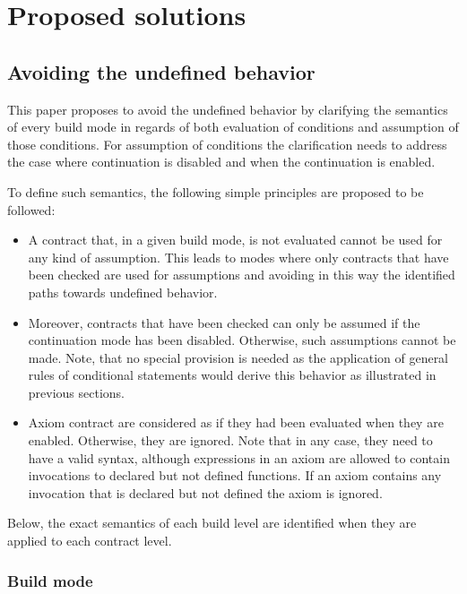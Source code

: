 \section{Proposed solutions}
\label{sec:proposed}

\subsection{Avoiding the undefined behavior}

This paper proposes to avoid the undefined behavior by clarifying the semantics of every
build mode in regards of both evaluation of conditions and assumption of those
conditions. For assumption of conditions the clarification needs to address the
case where continuation is disabled and when the continuation is enabled.

To define such semantics, the following simple principles are proposed to be followed:

\begin{itemize}

\item A contract that, in a given build mode, is not evaluated cannot be used
for any kind of assumption. This leads to modes where only contracts that have
been checked are used for assumptions and avoiding in this way the identified
paths towards undefined behavior.

\item Moreover, contracts that have been checked can only be assumed if the
continuation mode has been disabled. Otherwise, such assumptions cannot be made.
Note, that no special provision is needed as the application of general rules
of conditional statements would derive this behavior as illustrated in previous
sections.

\item Axiom contract are considered as if they had been evaluated when they are
	enabled. Otherwise, they are ignored.  Note that in any case, they need
		to have a valid syntax, although expressions in an axiom are
		allowed to contain invocations to declared but not defined
		functions. If an axiom contains any invocation that is declared
		but not defined the axiom is ignored.

\end{itemize}

Below, the exact semantics of each build level are identified when 
they are applied
to each contract level.

\subsubsection{Build mode}

